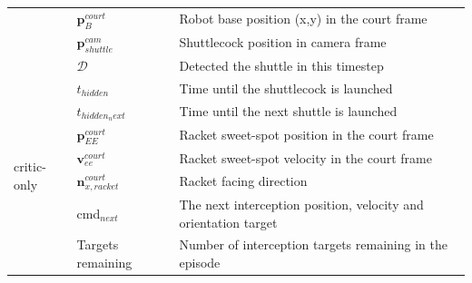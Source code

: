 \documentclass[9pt,twocolumn,twoside]{osajnl}
\begin{document}
\begin{table}
\begin{tabular}{p{1.8cm}p{3cm}p{12cm}}
    \multicolumn{1}{l|}{}                              & $\mathbf{p}_{B}^{court}$                      & Robot base position (x,y) in the court frame                                                                        \\
    \multicolumn{1}{l|}{}                              &   $\mathbf{p}_{shuttle}^{cam}$                      & Shuttlecock position in camera frame                                                                                \\
    \multicolumn{1}{l|}{}                              & $\mathcal{D}$         & Detected the shuttle in this timestep                                                                               \\ \hline
    \multicolumn{1}{l|}{\multirow{12}{*}{critic-only}} & \cellcolor{grey}$t_{hidden}$                & Time until the shuttlecock is launched                                                                              \\
    \multicolumn{1}{l|}{}                              & \cellcolor{grey}$t_{hidden_next}$          & Time until the next shuttle is launched                                                                             \\
    \multicolumn{1}{l|}{}                              & $\mathbf{p}_{EE}^{court}$                    & Racket sweet-spot position in the court frame                                                                       \\
    \multicolumn{1}{l|}{}                              & $\mathbf{v}^{court}_{ee}$                  & Racket sweet-spot velocity in the court frame                                                                       \\
    \multicolumn{1}{l|}{}                              & $\mathbf{n}_{x,racket}^{court}$            & Racket facing direction                                                                                             \\
    \multicolumn{1}{l|}{}                              & \cellcolor{grey}cmd$_{next}$                & The next interception position, velocity and orientation target                                                     \\
    \multicolumn{1}{l|}{}                              & \cellcolor{grey}Targets remaining      & Number of interception targets remaining in the episode                                                             \\

\end{tabular}
\end{table}
\end{document}
